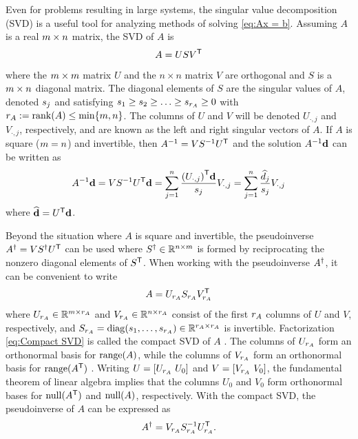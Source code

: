 \documentclass[12pt]{article}
\begin{document}
Even for problems resulting in large systems, the singular value decomposition (SVD) is a useful tool for analyzing methods of solving \eqref{eq:Ax = b}.  Assuming $A$ is a real $m \times n$ matrix, the SVD of $A$ is
\begin{equation}
\label{eq:SVD}
A = US{V}^\mathsf{T}
\end{equation}
where the $m \times m$ matrix $U$ and the $n \times n$ matrix $V$ are orthogonal and $S$ is a $m \times n$ diagonal matrix. The diagonal elements of $S$ are the singular values of $A$, denoted $s_j$ and satisfying $s_1 \geq s_2 \geq \ldots \geq s_{r_A} \geq 0$ with $r_A := \operatorname{rank}(A) \leq \min\{m,n\}$. The columns of $U$ and $V$ will be denoted $U_{\cdot,j}$ and $V_{\cdot,j}$, respectively, and are known as the left and right singular vectors of $A$. If $A$ is square ($m = n$) and invertible, then ${A}^{-1} = V{S}^{-1}{U}^\mathsf{T}$ and the solution ${A}^{-1}\mathbf{d}$ can be written as
\begin{equation}
\label{eq:InvProd}
{A}^{-1}\mathbf{d} = VS^{-1}{{U}^\mathsf{T}}\mathbf{d} = \sum_{j=1}^{n} \frac{{{(U_{\cdot,j})}^\mathsf{T}}\mathbf{d}}{s_j}V_{\cdot,j} = \sum_{j=1}^{n} \frac{\widehat{d}_j}{s_j}V_{\cdot,j}
\end{equation}
where $\widehat{\mathbf{d}} = {U}^\mathsf{T}\mathbf{d}$. \par 
Beyond the situation where $A$ is square and invertible, the pseudoinverse \cite{Penrose1955} ${A}^\dagger = V{S}^\dagger{U}^\mathsf{T}$ can be used where ${S}^\dagger \in \mathbb{R}^{n \times m}$ is formed by reciprocating the nonzero diagonal elements of ${S}^\mathsf{T}$. When working with the pseudoinverse ${A}^\dagger$, it can be convenient to write
\begin{equation}
\label{eq:Compact SVD}
A = U_{r_A}S_{r_A}{V}^\mathsf{T}_{r_A}
\end{equation}
where $U_{r_A} \in \mathbb{R}^{m \times r_A}$ and $V_{r_A} \in \mathbb{R}^{n \times r_A}$ consist of the first $r_A$ columns of $U$ and $V$, respectively, and $S_{r_A} = \operatorname{diag}(s_1,\ldots,s_{r_A}) \in \mathbb{R}^{r_A \times r_A}$ is invertible. Factorization \eqref{eq:Compact SVD} is called the compact SVD of $A$ \cite{ABT,Leon2010}. The columns of $U_{r_A}$ form an orthonormal basis for $\operatorname{range}(A)$, while the columns of $V_{r_A}$ form an orthonormal basis for $\operatorname{range}({A}^\mathsf{T})$ \cite[p.~340]{Leon2010}. Writing $U = [U_{r_A} ~ U_0]$ and $V = [V_{r_A} ~ V_0]$, the fundamental theorem of linear algebra \cite{Strang1993} implies that the columns $U_0$  and $V_0$ form orthonormal bases for $\operatorname{null}({A}^\mathsf{T})$ and $\operatorname{null}(A)$, respectively. With the compact SVD, the pseudoinverse of $A$ can be expressed as 
\begin{equation}
\label{eq:Pseudoinverse}
    {A}^\dagger = V_{r_A}{S}^{-1}_{r_A}{U}^\mathsf{T}_{r_A}.
\end{equation}
\end{document}
